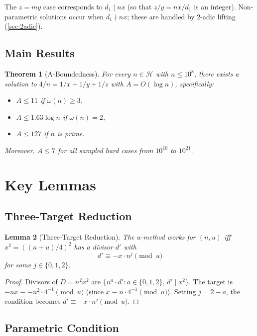 \documentclass[11pt,a4paper]{article}
\theoremstyle{plain}
\newtheorem{theorem}{Theorem}[section]
\newtheorem{lemma}[theorem]{Lemma}
\theoremstyle{definition}
\newcommand{\Hard}{\mathcal{H}}
\begin{document}
The $z = my$ case corresponds to $d_1 \mid nx$ (so that $z/y = nx/d_1$ is an integer). Non-parametric solutions occur when $d_1 \nmid nx$; these are handled by 2-adic lifting (\cref{sec:2adic}).

\subsection{Main Results}

\begin{theorem}[A-Boundedness]
\label{thm:main}
For every $n \in \Hard$ with $n \leq 10^8$, there exists a solution to $4/n = 1/x + 1/y + 1/z$ with $A = O(\log n)$, specifically:
\begin{itemize}
\item $A \leq 11$ if $\omega(n) \geq 3$,
\item $A \leq 1.63 \log n$ if $\omega(n) = 2$,
\item $A \leq 127$ if $n$ is prime.
\end{itemize}
Moreover, $A \leq 7$ for all sampled hard cases from $10^{10}$ to $10^{21}$.
\end{theorem}

\section{Key Lemmas}

\subsection{Three-Target Reduction}

\begin{lemma}[Three-Target Reduction]
\label{lem:threetarget}
The $u$-method works for $(n, u)$ iff $x^2 = ((n+u)/4)^2$ has a divisor $d'$ with
\[
d' \equiv -x \cdot n^j \pmod{u}
\]
for some $j \in \{0, 1, 2\}$.
\end{lemma}

\begin{proof}
Divisors of $D = n^2 x^2$ are $\{n^a \cdot d' : a \in \{0,1,2\},\, d' \mid x^2\}$. The target is $-nx \equiv -n^2 \cdot 4^{-1} \pmod{u}$ (since $x \equiv n \cdot 4^{-1} \pmod{u}$). Setting $j = 2 - a$, the condition becomes $d' \equiv -x \cdot n^j \pmod{u}$.
\end{proof}

\subsection{Parametric Condition}
\end{document}
